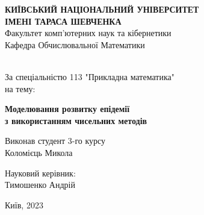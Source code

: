 \begin{titlepage}
    \begin{center}
        \large \textbf{КИЇВСЬКИЙ НАЦІОНАЛЬНИЙ УНІВЕРСИТЕТ \\
            ІМЕНІ ТАРАСА ШЕВЧЕНКА} \\

        \vspace{0.5cm}
        Факультет комп’ютерних наук та кібернетики \\
        Кафедра Обчислювальної Математики
        \vspace{2.5cm}
        \vfill

        \\[2mm]

        За спеціальністю 113 "Прикладна математика" \\
        на тему:

        \vfill

        {\LARGE \textbf{Моделювання розвитку епідемії \\
                з використанням чисельних методів}}
        \bigskip
        \vspace{6cm}

    \end{center}
    \vfill

    \newlength{\ML}
    \settowidth{\ML}{}
    \begin{minipage}{0.5\textwidth}
        Виконав студент 3-го курсу \\
        Коломієць Микола
    \end{minipage}%
    \bigskip

    \begin{minipage}{0.5\textwidth}
        Науковий керівник:\\
        Тимошенко Андрій
    \end{minipage}%
    \vfill

    \vspace{2cm}

    \begin{center}
        Київ, 2023
    \end{center}

\end{titlepage}

